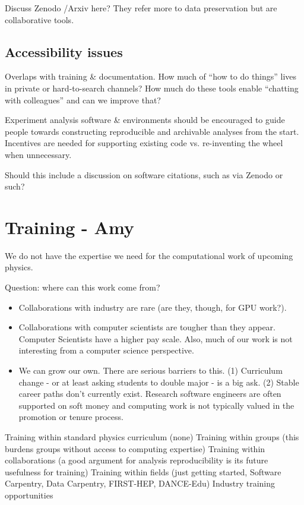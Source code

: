 Discuss Zenodo /Arxiv here? They refer more to data preservation but are collaborative tools.
\subsection{Accessibility issues}
Overlaps with training \& documentation.
How much of “how to do things” lives in private or hard-to-search channels?
How much do these tools enable “chatting with colleagues” and can we improve that?


Experiment analysis software \& environments should be encouraged to guide people towards constructing reproducible and archivable analyses from the start.
Incentives are needed for supporting existing code vs. re-inventing the wheel when unnecessary.

\begin{comment}
Tools for collaboration
git
Many people love git
Some people feel that more git training is needed
\end{comment}


Should this include a discussion on software citations, such as via Zenodo or such?

\section{Training - Amy}

We do not have the expertise we need for the computational work of upcoming physics.

Question: where can this work come from?

\begin{itemize}
\item Collaborations with industry are rare (are they, though, for GPU work?).  
\item Collaborations with computer scientists are tougher than they appear.  Computer Scientists have a higher pay scale.  Also, much of our work is not interesting from a computer science perspective.
\item We can grow our own.  There are serious barriers to this.  (1) Curriculum change - or at least asking students to double major - is a big ask.  (2) Stable career paths don't currently exist.  Research software engineers are often supported on soft money and computing work is not typically valued in the promotion or tenure process.
\end{itemize}

Training within standard physics curriculum (none)
Training within groups (this burdens groups without access to computing expertise)
Training within collaborations (a good argument for analysis reproducibility is its future usefulness for training)
Training within fields (just getting started, Software Carpentry, Data Carpentry, FIRST-HEP, DANCE-Edu)
Industry training opportunities

